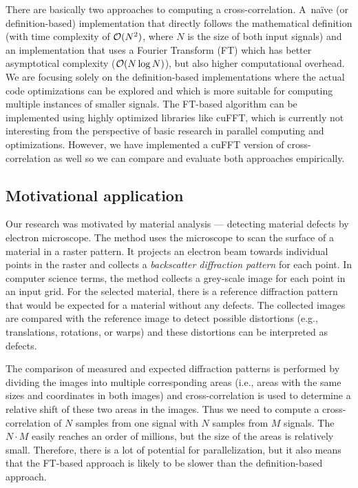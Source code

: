 There are basically two approaches to computing a cross-correlation. A~na\"{i}ve (or definition-based) implementation that directly follows the mathematical definition (with time complexity of ${\cal O}(N^2)$, where $N$ is the size of both input signals) and an implementation that uses a Fourier Transform (FT) which has better asymptotical complexity (${\cal O}(N \log N)$), but also higher computational overhead. We are focusing solely on the definition-based implementations where the actual code optimizations can be explored and which is more suitable for computing multiple instances of smaller signals. The FT-based algorithm can be implemented using highly optimized libraries like cuFFT, which is currently not interesting from the perspective of basic research in parallel computing and optimizations. However, we have implemented a cuFFT version of cross-correlation as well so we can compare and evaluate both approaches empirically.


\subsection{Motivational application}\label{sec:intro-motivation}

Our research was motivated by material analysis --- detecting material defects by electron microscope. The method uses the microscope to scan the surface of a material in a raster pattern. It projects an electron beam towards individual points in the raster and collects a \emph{backscatter diffraction pattern} for each point. In computer science terms, the method collects a grey-scale image for each point in an input grid. For the selected material, there is a reference diffraction pattern that would be expected for a material without any defects. The collected images are compared with the reference image to detect possible distortions (e.g., translations, rotations, or warps) and these distortions can be interpreted as defects.

The comparison of measured and expected diffraction patterns is performed by dividing the images into multiple corresponding areas (i.e., areas with the same sizes and coordinates in both images) and cross-correlation is used to determine a relative shift of these two areas in the images. Thus we need to compute a cross-correlation of $N$ samples from one signal with $N$ samples from $M$ signals. The $N\cdot M$ easily reaches an order of millions, but the size of the areas is relatively small. Therefore, there is a lot of potential for parallelization, but it also means that the FT-based approach is likely to be slower than the definition-based approach.


